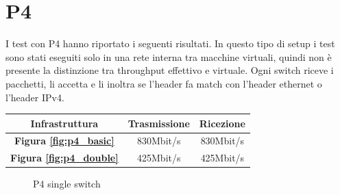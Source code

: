 \section*{P4}

I test con P4 hanno riportato i seguenti risultati.
In questo tipo di setup i test sono stati eseguiti solo in una rete interna tra macchine virtuali, quindi non è presente la distinzione tra throughput effettivo e virtuale. Ogni switch riceve i pacchetti, li accetta e li inoltra se l'header fa match con l'header ethernet o l'header IPv4.

\vspace{1cm}
\begin{center}
\begin{tabular}[h!]{ |c|c|c| } 
\hline
\rule{0pt}{4ex}
Infrastruttura & Trasmissione & Ricezione \\
\hline
\rule{0pt}{4ex}
\textbf{{Figura \ref{fig:p4_basic}}} & 830Mbit/s & 830Mbit/s \\ 
\hline
\rule{0pt}{4ex}
\textbf{{Figura \ref{fig:p4_double}}} & 425Mbit/s & 425Mbit/s \\ 
\hline
\end{tabular}
\end{center}
\vspace{1cm}

\FloatBarrier
\begin{figure}%
    \centering
    \qquad
    \caption{P4 single switch}%
    \label{fig:h1_p4basic_patrick}%
\end{figure}
\FloatBarrier



